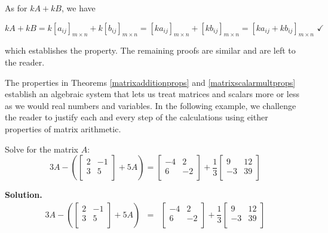 \documentclass{ximera}
\begin{document}
As for $kA + kB$, we have

\[ kA + kB = k\left[a_{ij}\right]_{m \times n}+k\left[b_{ij}\right]_{m \times n} =  \left[ka_{ij}\right]_{m \times n}+\left[kb_{ij}\right]_{m \times n} = \left[ka_{ij} + kb_{ij}\right]_{m \times n} \, \, \checkmark \]

which establishes the property.  The remaining proofs are similar and are left to the reader.  


The properties in Theorems \ref{matrixadditionprops} and \ref{matrixscalarmultprops} establish an algebraic system that lets us treat matrices and scalars more or less as we would real numbers and variables.  In the following example, we challenge the reader to justify each and every step of the calculations using either properties of matrix arithmetic.

\begin{example} \label{matrixaddscalarex} Solve for the matrix $A$:  \[3A - \left(\left[ \begin{array}{rr} 2 & -1 \\ 3 & 5 \\ \end{array}\right] + 5A\right) = \left[ \begin{array}{rr} -4 & 2 \\ 6 & -2 \\ \end{array}\right] + \dfrac{1}{3} \left[ \begin{array}{rr} 9 & 12 \\ -3 & 39 \\ \end{array}\right] \]
\newpage

{\bf Solution.} \[ \begin{array}{rcl}

3A - \left(\left[ \begin{array}{rr} 2 & -1 \\ 3 & 5 \\ \end{array}\right] + 5A\right) & = & \left[ \begin{array}{rr} -4 & 2 \\ 6 & -2 \\ \end{array}\right] + \dfrac{1}{3} \left[ \begin{array}{rr} 9 & 12 \\ -3 & 39 \\ \end{array}\right]  \\ [13pt]




\end{array}\]
\end{example}
\end{document}
